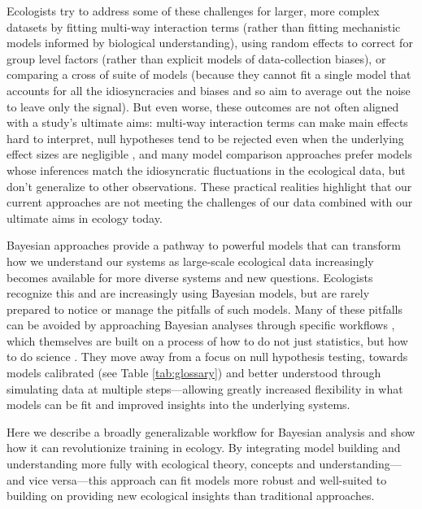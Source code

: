 \documentclass[11pt]{article}
\begin{document}
{Ecologists try to address some of these challenges for larger, more complex datasets by fitting multi-way interaction terms (rather than fitting mechanistic models informed by biological understanding), using random effects to correct for group level factors (rather than explicit models of data-collection biases), or comparing a cross of suite of models (because they cannot fit a single model that accounts for all the idiosyncracies and biases and so aim to average out the noise to leave only the signal).
But even worse, these outcomes are not often aligned with a study's ultimate aims:  multi-way interaction terms can make main effects hard to interpret, null hypotheses tend to be rejected even when the underlying effect sizes are negligible \citep{gelmanhill,muff2022rewriting}, and many model comparison approaches prefer models whose inferences match the idiosyncratic fluctuations in the ecological data, but don’t generalize to other observations. These practical realities highlight that our current approaches are not meeting the challenges of our data combined with our ultimate aims in ecology today.

Bayesian approaches provide a pathway to powerful models that can transform how we understand our systems as large-scale ecological data increasingly becomes available for more diverse systems and new questions. Ecologists recognize this and are increasingly using Bayesian models, but are rarely prepared to notice or manage the pitfalls of such models. Many of these pitfalls can be avoided by approaching Bayesian analyses through specific workflows \citep{betanworkflow,vandeschoot2021}, which themselves are built on a process of how to do not just statistics, but how to do science \citep{box1976science}. %
They move away from a focus on null hypothesis testing, towards models calibrated (see Table \ref{tab:glossary}) and better understood through simulating data at multiple steps---allowing greatly increased flexibility in what models can be fit and improved insights into the underlying systems.

Here we describe a broadly generalizable workflow for Bayesian analysis and show how it can revolutionize training in ecology. By integrating model building and understanding more fully with ecological theory, concepts and understanding---and vice versa---this approach can fit models more robust and well-suited to building on providing new ecological insights than traditional approaches. 
% 

}
\end{document}
